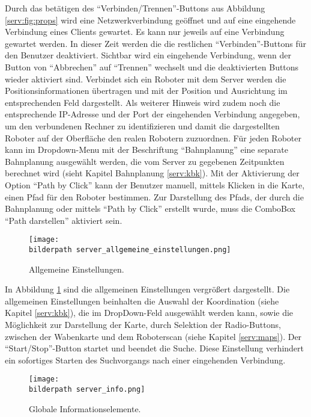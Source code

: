 Durch das betätigen des "`Verbinden/Trennen"'-Buttons aus Abbildung \ref{serv:fig:props} wird eine Netzwerkverbindung geöffnet und auf eine eingehende Verbindung eines Clients gewartet. Es kann nur jeweils auf eine Verbindung gewartet werden. In dieser Zeit werden die die restlichen "`Verbinden"'-Buttons für den Benutzer deaktiviert. Sichtbar wird ein eingehende Verbindung, wenn der Button von "`Abbrechen"' auf "`Trennen"' wechselt und die deaktivierten Buttons wieder aktiviert sind. Verbindet sich ein Roboter mit dem Server werden die Positionsinformationen übertragen und mit der Position und Ausrichtung im entsprechenden Feld dargestellt. Als weiterer Hinweis wird zudem noch die entsprechende IP-Adresse und der Port der eingehenden Verbindung angegeben, um den verbundenen Rechner zu identifizieren und damit die dargestellten Roboter auf der Oberfläche den realen Robotern zuzuordnen. Für jeden Roboter kann im Dropdown-Menu mit der Beschriftung "`Bahnplanung"' eine separate Bahnplanung ausgewählt werden, die vom Server zu gegebenen Zeitpunkten berechnet wird (sieht Kapitel Bahnplanung \ref{serv:kbk}). Mit der Aktivierung der Option "`Path by Click"' kann der Benutzer manuell, mittels Klicken in die Karte, einen Pfad für den Roboter bestimmen. Zur Darstellung des Pfads, der durch die Bahnplanung oder mittels "`Path by Click"' erstellt wurde, muss die ComboBox "`Path darstellen"' aktiviert sein.\\ 

\begin{figure}[h]
	\centering	
	\texttt{[image: \\bilderpath server\_allgemeine\_einstellungen.png]}
	\caption{Allgemeine Einstellungen.}
	\label{serv:fig:general}
\end{figure}

In Abbildung \ref{serv:fig:general} sind die allgemeinen Einstellungen vergrößert dargestellt. Die allgemeinen Einstellungen beinhalten die Auswahl der Koordination (siehe Kapitel \ref{serv:kbk}), die im DropDown-Feld ausgewählt werden kann, sowie die Möglichkeit zur Darstellung der Karte, durch Selektion der Radio-Buttons, zwischen der Wabenkarte und dem Roboterscan (siehe Kapitel \ref{serv:maps}). Der "`Start/Stop"'-Button startet und beendet die Suche. Diese Einstellung verhindert ein sofortiges Starten des Suchvorgangs nach einer eingehenden Verbindung.

\begin{figure}[h]
	\centering	
	\texttt{[image: \\bilderpath server\_info.png]}
	\caption{Globale Informationselemente.}
	\label{serv:fig:info}
\end{figure}

